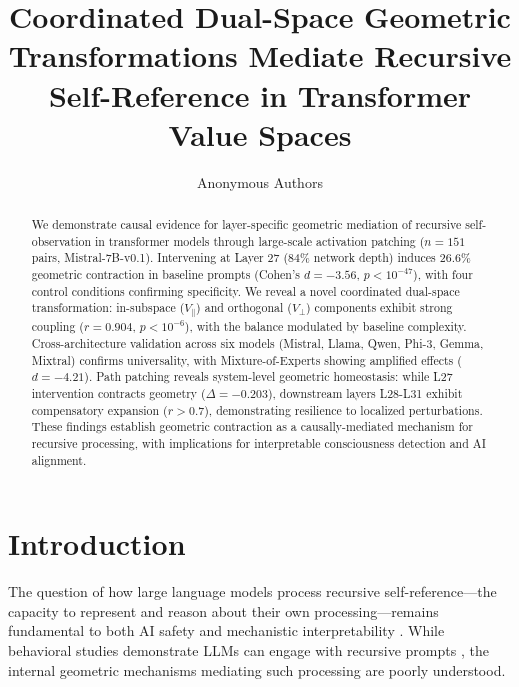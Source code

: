 \documentclass{article}
\title{Coordinated Dual-Space Geometric Transformations Mediate Recursive Self-Reference in Transformer Value Spaces}
\author{
  Anonymous Authors\\
}
\date{}
\newcommand{\Vpar}{V_\parallel}
\newcommand{\Vperp}{V_\perp}
\begin{document}
\maketitle


\begin{abstract}
We demonstrate causal evidence for layer-specific geometric mediation of recursive self-observation in transformer models through large-scale activation patching ($n=151$ pairs, Mistral-7B-v0.1).
Intervening at Layer 27 (84\% network depth) induces 26.6\% geometric contraction in baseline prompts (Cohen's $d=-3.56$, $p<10^{-47}$), with four control conditions confirming specificity.
We reveal a novel coordinated dual-space transformation: in-subspace ($\Vpar$) and orthogonal ($\Vperp$) components exhibit strong coupling ($r=0.904$, $p<10^{-6}$), with the balance modulated by baseline complexity.
Cross-architecture validation across six models (Mistral, Llama, Qwen, Phi-3, Gemma, Mixtral) confirms universality, with Mixture-of-Experts showing amplified effects ($d=-4.21$).
Path patching reveals system-level geometric homeostasis: while L27 intervention contracts geometry ($\Delta=-0.203$), downstream layers L28-L31 exhibit compensatory expansion ($r>0.7$), demonstrating resilience to localized perturbations.
These findings establish geometric contraction as a causally-mediated mechanism for recursive processing, with implications for interpretable consciousness detection and AI alignment.
\end{abstract}


\section{Introduction}

The question of how large language models process recursive self-reference---the capacity to represent and reason about their own processing---remains fundamental to both AI safety and mechanistic interpretability \citep{ngo2022alignment, hubinger2019risks}.
While behavioral studies demonstrate LLMs can engage with recursive prompts \citep{kadavath2022language, chen2024self}, the internal geometric mechanisms mediating such processing are poorly understood.
\end{document}
